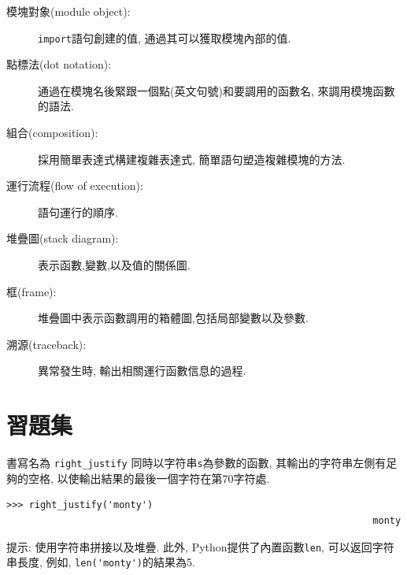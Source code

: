 \documentclass[10pt]{book}
\begin{document}
\begin{description}
\item[模塊對象(module object):]  {\tt import}語句創建的值, 通過其可以獲取模塊內部的值. 

\item[點標法(dot notation):]  通過在模塊名後緊跟一個點(英文句號)和要調用的函數名, 
來調用模塊函數的語法. 

\item[組合(composition):] 採用簡單表達式構建複雜表達式, 簡單語句塑造複雜模塊的方法. 

\item[運行流程(flow of execution):] 語句運行的順序.

\item[堆疊圖(stack diagram):]  表示函數,變數,以及值的關係圖. 

\item[框(frame):]  堆疊圖中表示函數調用的箱體圖,包括局部變數以及參數. 

\item[溯源(traceback):] 異常發生時, 輸出相關運行函數信息的過程. 


\end{description}


\section{習題集}

\begin{exercise}

書寫名為 \verb"right_justify" 同時以字符串{\tt s}為參數的函數, 
其輸出的字符串左側有足夠的空格, 以使輸出結果的最後一個字符在第70字符處. 

\begin{verbatim}
>>> right_justify('monty')
                                                                 monty
\end{verbatim}

提示: 使用字符串拼接以及堆疊. 此外, Python提供了內置函數{\tt len}, 可以返回字符串長度, 
例如, \verb"len('monty')"的結果為5.

\end{exercise}
\end{document}
